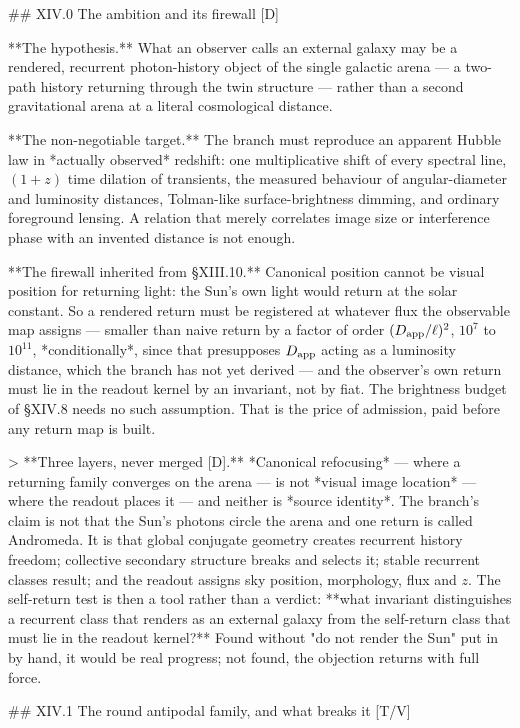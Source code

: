 ## XIV.0 The ambition and its firewall [D]

**The hypothesis.** What an observer calls an external galaxy may be a rendered, recurrent photon-history object of the single galactic arena — a two-path history returning through the twin structure — rather than a second gravitational arena at a literal cosmological distance.

**The non-negotiable target.** The branch must reproduce an apparent Hubble law in *actually observed* redshift: one multiplicative shift of every spectral line, $(1+z)$ time dilation of transients, the measured behaviour of angular-diameter and luminosity distances, Tolman-like surface-brightness dimming, and ordinary foreground lensing. A relation that merely correlates image size or interference phase with an invented distance is not enough.

**The firewall inherited from §XIII.10.** Canonical position cannot be visual position for returning light: the Sun's own light would return at the solar constant. So a rendered return must be registered at whatever flux the observable map assigns — smaller than naive return by a factor of order $(D_{\rm app}/\ell)^2$, $10^7$ to $10^{11}$, *conditionally*, since that presupposes $D_{\rm app}$ acting as a luminosity distance, which the branch has not yet derived — and the observer's own return must lie in the readout kernel by an invariant, not by fiat. The brightness budget of §XIV.8 needs no such assumption. That is the price of admission, paid before any return map is built.

> **Three layers, never merged [D].** *Canonical refocusing* — where a returning family converges on the arena — is not *visual image location* — where the readout places it — and neither is *source identity*. The branch's claim is not that the Sun's photons circle the arena and one return is called Andromeda. It is that global conjugate geometry creates recurrent history freedom; collective secondary structure breaks and selects it; stable recurrent classes result; and the readout assigns sky position, morphology, flux and $z$. The self-return test is then a tool rather than a verdict: **what invariant distinguishes a recurrent class that renders as an external galaxy from the self-return class that must lie in the readout kernel?** Found without "do not render the Sun" put in by hand, it would be real progress; not found, the objection returns with full force.

## XIV.1 The round antipodal family, and what breaks it [T/V]

